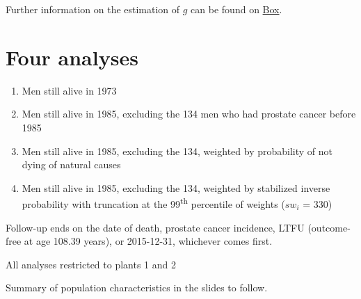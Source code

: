 \documentclass[
  11pt,
  letterpaper,
  DIV=11,
  numbers=noendperiod]{scrartcl}
\providecommand{\tightlist}{%
  \setlength{\itemsep}{0pt}\setlength{\parskip}{0pt}}\usepackage{longtable,booktabs,array}
\theoremstyle{remark}\newtheorem*{claim}{Claim}
\begin{document}
Further information on the estimation of \(g\) can be found on
\href{https://berkeley.app.box.com/folder/114285681411}{Box}.

\hypertarget{four-analyses}{%
\section{Four analyses}\label{four-analyses}}

\begin{enumerate}
\def\labelenumi{\arabic{enumi}.}
\tightlist
\item
  Men still alive in 1973
\item
  Men still alive in 1985, excluding the 134 men who had prostate cancer
  before 1985
\item
  Men still alive in 1985, excluding the 134, weighted by probability of
  not dying of natural causes
\item
  Men still alive in 1985, excluding the 134, weighted by stabilized
  inverse probability with truncation at the 99\textsuperscript{th}
  percentile of weights (\(sw_i\) = 330)
\end{enumerate}

Follow-up ends on the date of death, prostate cancer incidence, LTFU
(outcome-free at age 108.39 years), or 2015-12-31, whichever comes
first.

All analyses restricted to plants 1 and 2

Summary of population characteristics in the slides to follow.

\hypertarget{section}{%
\section{}\label{section}}
\end{document}
